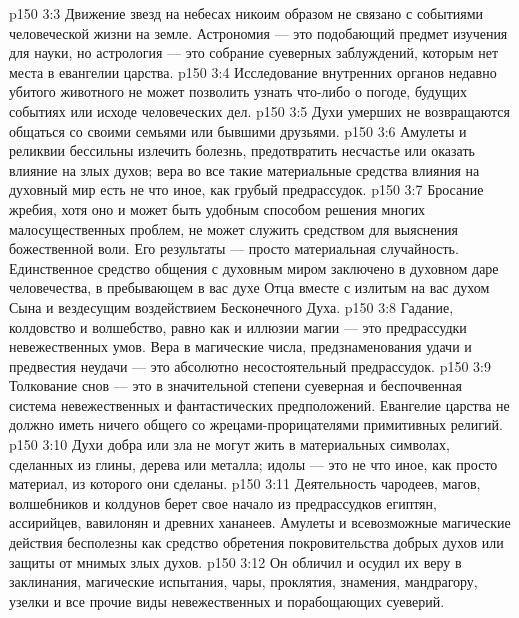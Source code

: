 \vs p150 3:3 \bibnobreakspace Движение звезд на небесах никоим образом не связано с событиями человеческой жизни на земле. Астрономия --- это подобающий предмет изучения для науки, но астрология --- это собрание суеверных заблуждений, которым нет места в евангелии царства.
\vs p150 3:4 \bibnobreakspace Исследование внутренних органов недавно убитого животного не может позволить узнать что\hyp{}либо о погоде, будущих событиях или исходе человеческих дел.
\vs p150 3:5 \bibnobreakspace Духи умерших не возвращаются общаться со своими семьями или бывшими друзьями.
\vs p150 3:6 \bibnobreakspace Амулеты и реликвии бессильны излечить болезнь, предотвратить несчастье или оказать влияние на злых духов; вера во все такие материальные средства влияния на духовный мир есть не что иное, как грубый предрассудок.
\vs p150 3:7 \bibnobreakspace Бросание жребия, хотя оно и может быть удобным способом решения многих малосущественных проблем, не может служить средством для выяснения божественной воли. Его результаты --- просто материальная случайность. Единственное средство общения с духовным миром заключено в духовном даре человечества, в пребывающем в вас духе Отца вместе с излитым на вас духом Сына и вездесущим воздействием Бесконечного Духа.
\vs p150 3:8 \bibnobreakspace Гадание, колдовство и волшебство, равно как и иллюзии магии --- это предрассудки невежественных умов. Вера в магические числа, предзнаменования удачи и предвестия неудачи --- это абсолютно несостоятельный предрассудок.
\vs p150 3:9 \bibnobreakspace Толкование снов --- это в значительной степени суеверная и беспочвенная система невежественных и фантастических предположений. Евангелие царства не должно иметь ничего общего со жрецами\hyp{}прорицателями примитивных религий.
\vs p150 3:10 \bibnobreakspace Духи добра или зла не могут жить в материальных символах, сделанных из глины, дерева или металла; идолы --- это не что иное, как просто материал, из которого они сделаны.
\vs p150 3:11 \bibnobreakspace Деятельность чародеев, магов, волшебников и колдунов берет свое начало из предрассудков египтян, ассирийцев, вавилонян и древних хананеев. Амулеты и всевозможные магические действия бесполезны как средство обретения покровительства добрых духов или защиты от мнимых злых духов.
\vs p150 3:12 \bibnobreakspace Он обличил и осудил их веру в заклинания, магические испытания, чары, проклятия, знамения, мандрагору, узелки и все прочие виды невежественных и порабощающих суеверий.
